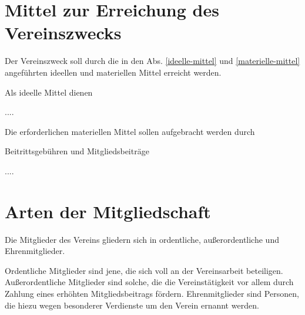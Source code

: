 \documentclass{article}
\begin{document}
\section{Mittel zur Erreichung des Vereinszwecks}
\begin{absatz}
    \item Der Vereinszweck soll durch die in den Abs. \ref{ideelle-mittel} und \ref{materielle-mittel} angeführten ideellen und materiellen Mittel erreicht werden.
    \item \label{ideelle-mittel} Als ideelle Mittel dienen
    \begin{littera}
      \item .... 
    \end{littera}
    \item \label{materielle-mittel} Die erforderlichen materiellen Mittel sollen aufgebracht werden durch
    \begin{littera}
        \item Beitrittsgebühren und Mitgliedsbeiträge
        \item ....
    \end{littera}
\end{absatz}



\section{Arten der Mitgliedschaft}
\begin{absatz}
    \item Die Mitglieder des Vereins gliedern sich in ordentliche, außerordentliche und Ehrenmitglieder.
    \item Ordentliche Mitglieder sind jene, die sich voll an der Vereinsarbeit beteiligen. Außerordentliche Mitglieder sind solche, die die Vereinstätigkeit vor allem durch Zahlung eines erhöhten Mitgliedsbeitrags fördern. Ehrenmitglieder sind Personen, die hiezu wegen besonderer Verdienste um den Verein ernannt werden.
\end{absatz}
\end{document}
